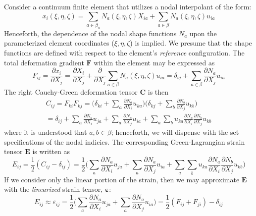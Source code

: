 \documentclass[11pt]{article} %
\begin{document}
Consider a continuum finite element that utilizes a nodal interpolant of the form:
\begin{equation}
	x_i (\xi, \eta, \zeta) = \sum_{a \in \beta_n} N_a (\xi, \eta, \zeta) X_{ia} + \sum_{a \in \beta} N_a (\xi, \eta, \zeta) u_{ia}
\end{equation}
Henceforth, the dependence of the nodal shape functions $N_a$ upon the parameterized element coordinates ($\xi, \eta, \zeta$) is implied. We presume that the shape functions are defined with respect to the element's \textit{reference} configuration. The total deformation gradient $\mathbf{F}$ within the element may be expressed as
\begin{equation}
	F_{ij} = \frac{\partial x_i}{\partial X_j} = \frac{\partial X_i}{\partial X_j} + \frac{\partial}{\partial X_j}\sum_{a \in \beta} N_a (\xi, \eta, \zeta) u_{ia} = \delta_{ij} + \sum_{a \in \beta} \frac{\partial N_a}{\partial X_j} u_{ia}
\end{equation}
The right Cauchy-Green deformation tensor $\mathbf{C}$ is then
\begin{eqnarray}
	C_{ij} = F_{ki} F_{kj} = \bigg( \delta_{ki} + \sum_a \frac{\partial N_a}{\partial X_i} u_{ka} \bigg) \bigg( \delta_{kj} + \sum_b \frac{\partial N_b}{\partial X_j} u_{kb} \bigg) \\ = \delta_{ij} + \sum_a \frac{\partial N_a}{\partial X_i} u_{ja} + \sum_a \frac{\partial N_a}{\partial X_j} u_{ia} + \sum_a \sum_b u_{ka} \frac{\partial N_a}{\partial X_i} \frac{\partial N_b}{\partial X_j} u_{kb}
\end{eqnarray}
where it is understood that $a,b \in \beta$; henceforth, we will dispense with the set specifications of the nodal indicies. The corresponding Green-Lagrangian strain tensor $\mathbf{E}$ is written as
\begin{equation}
	E_{ij} = \frac{1}{2} (C_{ij} - \delta_{ij}) = \frac{1}{2} \bigg( \sum_a \frac{\partial N_a}{\partial X_i} u_{ja} + \sum_a \frac{\partial N_a}{\partial X_j} u_{ia} + \sum_a \sum_b u_{ka} \frac{\partial N_a}{\partial X_i} \frac{\partial N_b}{\partial X_j} u_{kb} \bigg)
\end{equation}
If we consider only the linear portion of the strain, then we may approximate $\mathbf{E}$ with the \textit{linearized} strain tensor, $\mathbf{\varepsilon}$:
\begin{equation}
	E_{ij} \approx \varepsilon_{ij} = \frac{1}{2} \bigg( \sum_a \frac{\partial N_a}{\partial X_i} u_{ja} + \sum_a \frac{\partial N_a}{\partial X_j} u_{ia} \bigg) = \frac{1}{2} (F_{ij} + F_{ji}) - \delta_{ij}
\end{equation}
\end{document}
